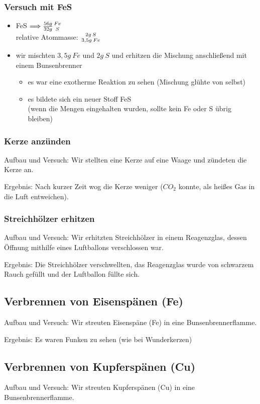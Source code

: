 \subsubsection{Versuch mit \acf{FeS}}
\begin{itemize}
\item FeS $\Longrightarrow \frac{56g}{32g}{{Fe}\atop {S}}$\\
relative Atommasse: ${2g\:S}\atop {3,5g\:Fe}$
\item wir mischten $3,5g\:Fe$ und $2g\:S$ und erhitzen die Mischung anschließend mit einem Bunsenbrenner
\begin{itemize}
\item es war eine exotherme Reaktion zu sehen (Mischung glühte von selbst)
\item es bildete sich ein neuer Stoff \acf{FeS}\\(wenn die Mengen eingehalten wurden, sollte kein \acf{Fe} oder \acf{S}
übrig bleiben)
\end{itemize}
\end{itemize}

\newpage
\subsubsection{Kerze anzünden}
Aufbau und Versuch: Wir stellten eine Kerze auf eine Waage und zündeten die Kerze an.

Ergebnis: Nach kurzer Zeit wog die Kerze weniger ($CO_2$ konnte, als heißes Gas in die Luft entweichen).
\subsubsection{Streichhölzer erhitzen}
Aufbau und Versuch: Wir erhitzten Streichhölzer in einem Reagenzglas, dessen Öffnung mithilfe eines
Luftballons verschlossen
war.

Ergebnis: Die Streichhölzer verschwellten, das Reagenzglas wurde von schwarzem Rauch gefüllt und der Luftballon füllte
sich.
\subsection{Verbrennen von Eisenspänen (Fe)}
Aufbau und Versuch: Wir streuten Eisenspäne (Fe) in eine Bunsenbrennerflamme.

Ergebnis: Es waren Funken zu sehen (wie bei Wunderkerzen)
\subsection{Verbrennen von Kupferspänen (Cu)}
Aufbau und Versuch: Wir streuten Kupferspänen (Cu) in eine Bunsenbrennerflamme.


